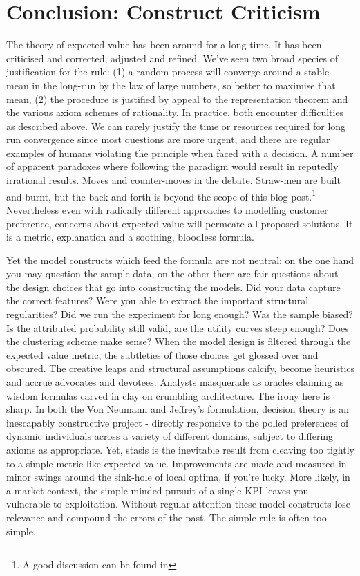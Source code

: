 \documentclass{tufte-handout}
\begin{document}
\section{\textbf{Conclusion: Construct Criticism}}
The theory of expected value has been around for a long time. It has been criticised and corrected, adjusted  and refined. We've seen two broad species of justification for the rule: (1) a random process will converge around a stable mean in the long-run by the law of large numbers, so better to maximise that mean, (2) the procedure is justified by appeal to the representation theorem and the various axiom schemes of rationality. In practice, both encounter difficulties as described above. We can rarely justify the time or resources required for long run convergence since most questions are more urgent, and there are regular examples of humans violating the principle when faced with a decision. A number of apparent paradoxes where following the paradigm would result in reputedly irrational results. Moves and counter-moves in the debate. Straw-men are built and burnt, but the back and forth is beyond the scope of this blog post.\footnote{A good discussion can be found in\cite{BinmoreRational}} Nevertheless even with radically different approaches to modelling customer preference, concerns about expected value will permeate all proposed solutions. It is a metric, explanation and a soothing, bloodless formula. 
\linebreak

\noindent Yet the model constructs which feed the formula are not neutral; on the one hand you may question the sample data, on the other there are fair questions about the design choices that go into constructing the models. Did your data capture the correct features? Were you able to extract the important structural regularities? Did we run the experiment for long enough? Was the sample biased? Is the attributed probability still valid, are the utility curves steep enough? Does the clustering scheme make sense? When the model design is filtered through the expected value metric, the subtleties of those choices get glossed over and obscured. The creative leaps and structural assumptions calcify, become heuristics and accrue advocates and devotees. Analysts masquerade as oracles claiming as wisdom formulas carved in clay on crumbling architecture. The irony here is sharp. In both the Von Neumann and Jeffrey's formulation, decision theory is an inescapably constructive project - directly responsive to the polled preferences of dynamic individuals across a variety of different domains, subject to differing axioms as appropriate. Yet, stasis is the inevitable result from cleaving too tightly to a simple metric like expected value. Improvements are made and measured in minor swings around the sink-hole of local optima, if you're lucky. More likely, in a market context, the simple minded pursuit of a single KPI leaves you vulnerable to exploitation. Without regular attention these model constructs lose relevance and compound the errors of the past. The simple rule is often too simple. 




\end{document}
